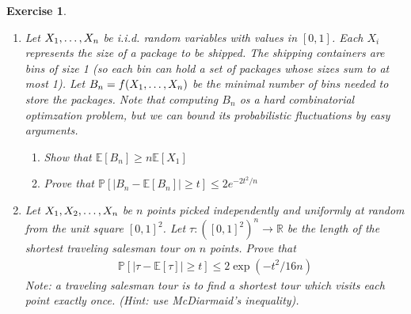 \documentclass[12pt]{article}
\theoremstyle{colon}
\newtheorem{exercise}{Exercise}
\begin{document}
\begin{exercise}
\begin{enumerate}[label=\arabic*)]
      Consider independent random variables $X_1, \mathellipsis, X_n$ satisfying $\mathbb{E}[X_i] = 0$ and have symmetric distributions, i.e., $X_i$ has the same distribution as $-X_i$ for any $1 \leq i \leq n$. Show that
      \begin{gather*}
        \mathbb{P} \left[ \sum_{i=1}^n X_i \geq t \left\{ \sum_{i=1}^n X_i^2 \right\}^{1/2} \right] \leq e^{-t^2/2} \text{ for all } t \geq 0
      \end{gather*}
      Hint: Apply symmetrization and Hoeffding inequality conditionally.
    \item Let $X_1, \mathellipsis, X_n$ be i.i.d. random variables with values in $[0,1]$. Each $X_i$ represents the size of a package to be shipped. The shipping containers are bins of size 1 (so each bin can hold a set of packages whose sizes sum to at most 1). Let $B_n = f(X_1, \mathellipsis, X_n)$ be the minimal number of bins needed to store the packages. Note that computing $B_n$ os a hard combinatorial optimzation problem, but we can bound its probabilistic fluctuations by easy arguments.
      \begin{enumerate}[label=\alph*)]
        \item Show that $\mathbb{E}[B_n] \geq n \mathbb{E}[X_1]$
        \item Prove that $\mathbb{P}[\lvert B_n - \mathbb{E}[B_n] \rvert \geq t] \leq 2 e^{-2t^2/n}$
      \end{enumerate}
    \item Let $X_1, X_2, \mathellipsis, X_n$ be $n$ points picked independently and uniformly at random from the unit square $[0,1]^2$. Let $\tau : ([0,1]^2)^n \rightarrow \mathbb{R}$ be the length of the shortest traveling salesman tour on $n$ points. Prove that
      \begin{gather*}
        \mathbb{P}[\lvert \tau - \mathbb{E}[\tau] \rvert \geq t] \leq 2 \exp(-t^2/16n)
      \end{gather*}
      Note: a traveling salesman tour is to find a shortest tour which visits each point exactly once. (Hint: use McDiarmaid's inequality).
  \end{enumerate}
\end{exercise}
\end{document}
